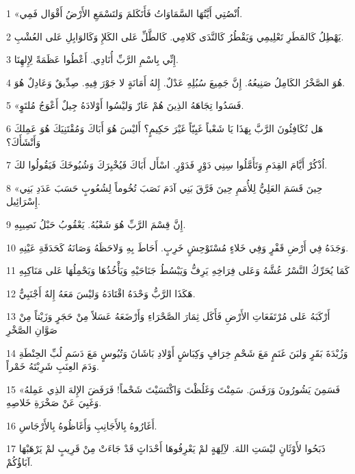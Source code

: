 \par 1 «اُنْصُتِي أَيَّتُهَا السَّمَاوَاتُ فَأَتَكَلمَ وَلتَسْمَعِ الأَرْضُ أَقْوَال فَمِي.
\par 2 يَهْطِلُ كَالمَطَرِ تَعْلِيمِي وَيَقْطُرُ كَالنَّدَى كَلامِي. كَالطَّلِّ عَلى الكَلإِ وَكَالوَابِلِ عَلى العُشْبِ.
\par 3 إِنِّي بِاسْمِ الرَّبِّ أُنَادِي. أَعْطُوا عَظَمَةً لِإِلهِنَا.
\par 4 هُوَ الصَّخْرُ الكَامِلُ صَنِيعُهُ. إِنَّ جَمِيعَ سُبُلِهِ عَدْلٌ. إِلهُ أَمَانَةٍ لا جَوْرَ فِيهِ. صِدِّيقٌ وَعَادِلٌ هُوَ.
\par 5 «فَسَدُوا تِجَاهَهُ الذِينَ هُمْ عَارٌ وَليْسُوا أَوْلادَهُ جِيلٌ أَعْوَجُ مُلتَوٍ.
\par 6 هَل تُكَافِئُونَ الرَّبَّ بِهَذَا يَا شَعْباً غَبِيّاً غَيْرَ حَكِيمٍ؟ أَليْسَ هُوَ أَبَاكَ وَمُقْتَنِيَكَ هُوَ عَمِلكَ وَأَنْشَأَكَ؟
\par 7 اُذْكُرْ أَيَّامَ القِدَمِ وَتَأَمَّلُوا سِنِي دَوْرٍ فَدَوْرٍ. اسْأَل أَبَاكَ فَيُخْبِرَكَ وَشُيُوخَكَ فَيَقُولُوا لكَ.
\par 8 «حِينَ قَسَمَ العَلِيُّ لِلأُمَمِ حِينَ فَرَّقَ بَنِي آدَمَ نَصَبَ تُخُوماً لِشُعُوبٍ حَسَبَ عَدَدِ بَنِي إِسْرَائِيل.
\par 9 إِنَّ قِسْمَ الرَّبِّ هُوَ شَعْبُهُ. يَعْقُوبُ حَبْلُ نَصِيبِهِ.
\par 10 وَجَدَهُ فِي أَرْضِ قَفْرٍ وَفِي خَلاءٍ مُسْتَوْحِشٍ خَرِبٍ. أَحَاطَ بِهِ وَلاحَظَهُ وَصَانَهُ كَحَدَقَةِ عَيْنِهِ.
\par 11 كَمَا يُحَرِّكُ النَّسْرُ عُشَّهُ وَعَلى فِرَاخِهِ يَرِفُّ وَيَبْسُطُ جَنَاحَيْهِ وَيَأْخُذُهَا وَيَحْمِلُهَا عَلى مَنَاكِبِهِ
\par 12 هَكَذَا الرَّبُّ وَحْدَهُ اقْتَادَهُ وَليْسَ مَعَهُ إِلهٌ أَجْنَبِيٌّ.
\par 13 أَرْكَبَهُ عَلى مُرْتَفَعَاتِ الأَرْضِ فَأَكَل ثِمَارَ الصَّحْرَاءِ وَأَرْضَعَهُ عَسَلاً مِنْ حَجَرٍ وَزَيْتاً مِنْ صَوَّانِ الصَّخْرِ
\par 14 وَزُبْدَةَ بَقَرٍ وَلبَنَ غَنَمٍ مَعَ شَحْمِ خِرَافٍ وَكِبَاشٍ أَوْلادِ بَاشَانَ وَتُيُوسٍ مَعَ دَسَمِ لُبِّ الحِنْطَةِ وَدَمَ العِنَبِ شَرِبْتَهُ خَمْراً.
\par 15 «فَسَمِنَ يَشُورُونَ وَرَفَسَ. سَمِنْتَ وَغَلُظْتَ وَاكْتَسَيْتَ شَحْماً! فَرَفَضَ الإِلهَ الذِي عَمِلهُ وَغَبِيَ عَنْ صَخْرَةِ خَلاصِهِ.
\par 16 أَغَارُوهُ بِالأَجَانِبِ وَأَغَاظُوهُ بِالأَرْجَاسِ.
\par 17 ذَبَحُوا لأَوْثَانٍ ليْسَتِ اللهَ. لآِلِهَةٍ لمْ يَعْرِفُوهَا أَحْدَاثٍ قَدْ جَاءَتْ مِنْ قَرِيبٍ لمْ يَرْهَبْهَا آبَاؤُكُمْ.
